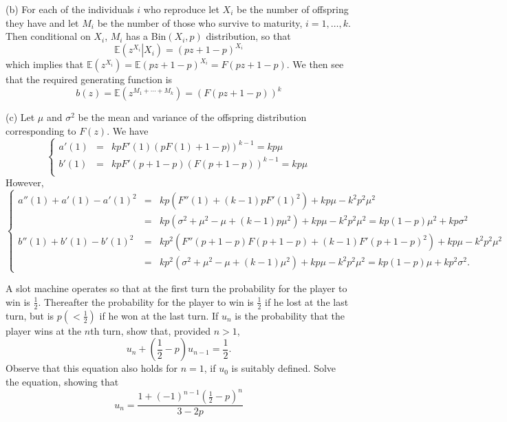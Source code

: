 (b) For each of the individuals $i$ who reproduce let $X_i$ be the number of offspring they have and let $M_i$ be the number of those who survive to maturity, $i=1,\dots,k$. Then conditional on $X_i$, $M_i$ has a Bin$(X_i,p)$ distribution, so that 
\begin{equation}
\mathbb{E}\left(\left.z^{X_i}\right|X_i\right) = (pz+1-p)^{X_i}
\end{equation}
which implies that $\mathbb{E}\left(z^{X_i}\right) = \mathbb{E}(pz+1-p)^{X_i}=F(pz+1-p)$. We then see that the required generating function is 
\begin{equation}
b(z) = \mathbb{E}\left(z^{M_1+\cdots+M_k}\right) = \left(F(pz+1-p)\right)^k
\end{equation}

(c) Let $\mu$ and $\sigma^2$ be the mean and variance of the offspring distribution corresponding to $F(z)$. We have
\begin{equation}
\left\{\begin{array}{ccl}
a'(1) & = & kpF'(1)\left(pF(1)+1-p)\right)^{k-1} = kp\mu \\
b'(1) & = & kpF'(p+1-p)\left(F(p+1-p)\right)^{k-1} = kp\mu \\
\end{array}\right.
\end{equation}
However,
\begin{equation}
\left\{\begin{array}{ccl}
a''(1)+a'(1)-a'(1)^2 & = & kp\left(F''(1)+(k-1)pF'(1)^2\right) +  kp\mu - k^2p^2\mu^2 \\
	& = & kp\left(\sigma^2+\mu^2-\mu+(k-1)p\mu^2\right) +  kp\mu - k^2p^2\mu^2 = kp\left(1-p\right)\mu^2 +kp\sigma^2 \\
b''(1)+b'(1)-b'(1)^2 & = & kp^2\left(F''(p+1-p)F(p+1-p)+ (k-1)F'(p+1-p)^2\right) +  kp\mu - k^2p^2\mu^2  \\
& = & kp^2\left(\sigma^2+\mu^2-\mu+ (k-1)\mu^2\right) +  kp\mu - k^2p^2\mu^2 = kp\left(1-p\right)\mu +kp^2\sigma^2 .
\end{array}\right.
\end{equation}


\item A slot machine operates so that at the first turn the probability for the player to win is $\frac 12$. Thereafter the probability for the player to win is $\frac 12$ if he lost at the last turn, but is $p(<\frac 12)$ if he won at the last turn. If $u_n$ is the probability that the player wins at the $n$th turn, show that, provided $n>1$, 
\begin{equation}
u_n+\left(\frac 12-p\right)u_{n-1}=\frac 12.
\end{equation}
Observe that this equation also holds for $n=1$, if $u_0$ is suitably defined. Solve the equation, showing that 
\begin{equation}
u_n=\frac{1+(-1)^{n-1}\left(\frac 12 -p\right)^n}{3-2p}
\end{equation}



